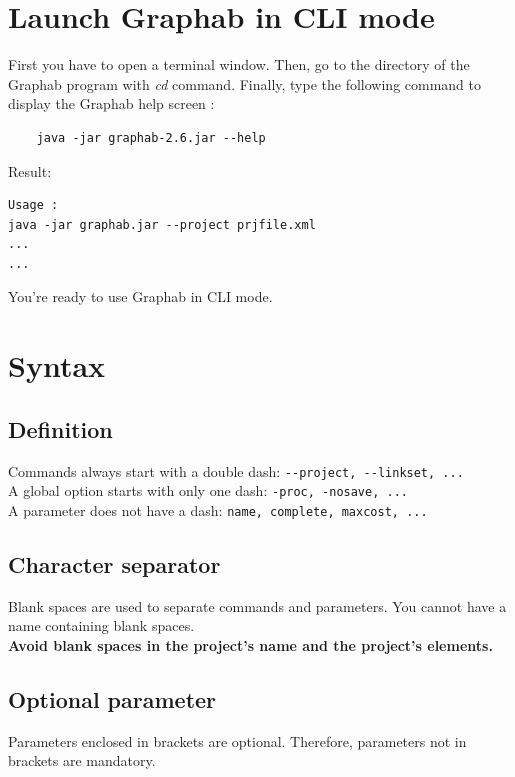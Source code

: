 \documentclass[a4paper,10pt]{report}
\begin{document}
\section{Launch Graphab in CLI mode}
First you have to open a terminal window.
Then, go to the directory of the Graphab program with \textit{cd} command.
Finally, type the following command to display the Graphab help screen :
\begin{Verbatim}
	java -jar graphab-2.6.jar --help
\end{Verbatim}
Result:
\begin{verbatim}
Usage :
java -jar graphab.jar --project prjfile.xml
...
...
\end{verbatim}
You're ready to use Graphab in CLI mode.

\section{Syntax}
\subsection{Definition}
Commands always start with a double dash: \verb|--project, --linkset, ...|\\
A global option starts with only one dash: \verb|-proc, -nosave, ...|\\
A parameter does not have a dash: \verb|name, complete, maxcost, ...|
\subsection{Character separator}
Blank spaces are used to separate commands and parameters. You cannot have a name containing blank spaces.\\
\textbf{Avoid blank spaces in the project's name and the project's elements.}
\subsection{Optional parameter}
Parameters enclosed in brackets are optional. 
Therefore, parameters not in brackets are mandatory.
\end{document}
